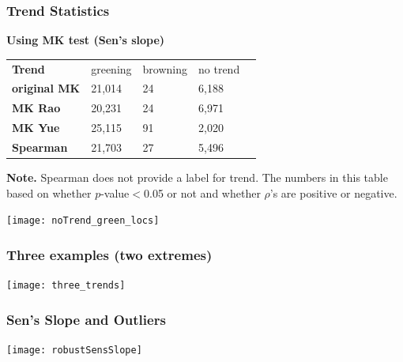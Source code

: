 \documentclass[serif, xcolor={dvipsnames}]{beamer} %
\begin{document}
\fi
\begin{frame}
\frametitle{Trend Statistics}
{\bf Using MK test (Sen's slope)}
\begin{table}[!ht]
\centering
\captionsetup{singlelinecheck=false, format=hang}
\label{tab:Trendcounts}
\begin{tabular}{lllll}
\bottomrule
\rowcolor{shadecolor} \textbf{Trend} & 
 greening & browning & no trend \\ 
\textbf{original MK}  & 21,014 & 24 & 6,188 \\
\rowcolor{shadecolor} \textbf{MK Rao}  & 20,231 & 24 & 6,971 \\
\textbf{MK Yue}  &  25,115 & 91 & 2,020 \\
\rowcolor{aliceblue}\textbf{Spearman}  & 21,703 & 27 & 5,496\\
\toprule
\end{tabular}
\end{table}
\begin{tcolorbox}
{\scriptsize{\bf Note.} Spearman does not provide a label for trend. The numbers
in this table based on whether $p$-value$<$0.05 or not and whether $\rho$'s are positive or negative.}
\end{tcolorbox}
\end{frame}
\begin{frame}
\begin{center}
\texttt{[image: noTrend\_green\_locs]}
\end{center}
\end{frame}
\begin{frame}
 \frametitle{Three examples (two extremes)}
\begin{center}
\texttt{[image: three\_trends]}
\end{center}
\end{frame}
\begin{frame}
 \frametitle{Sen's Slope and Outliers}
\begin{center}
\texttt{[image: robustSensSlope]}
\end{center}
\end{frame}
\end{document}
